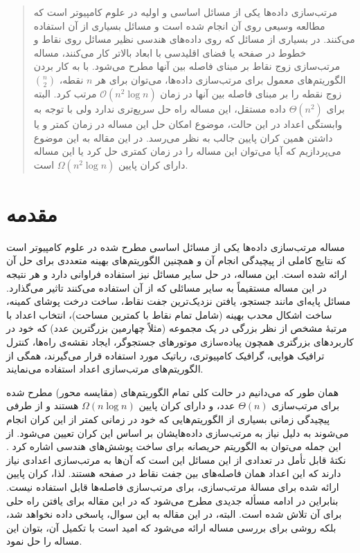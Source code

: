 \documentclass[a0,portrait]{a0poster}
\theoremstyle{definition}
\theoremstyle{plain}
\theoremstyle{definition}
\def\OO{\mathcal{O}}
\newcommand{\keywords}[1]{}
\newcommand{\subject}[1]{}
\begin{document}
\begin{multicols}{2} %




\begin{abstract}\normalsize
مرتب‌سازی داده‌ها یکی از مسائل اساسی و اولیه در علوم کامپیوتر است که مطالعه وسیعی روی آن انجام شده
است و مسائل بسیاری از آن استفاده می‌کنند. در بسیاری از مسائل که روی داده‌های هندسی نظیر مسائل روی نقاط و خطوط در صفحه یا
فضای اقلیدسی با ابعاد بالاتر کار می‌کنند، مساله مرتب‌سازی زوج نقاط بر مبنای
فاصله بین آنها مطرح می‌شود. با به کار بردن الگوریتم‌های معمول برای مرتب‌سازی
داده‌ها، می‌توان برای هر $n$ نقطه، $n\choose 2$ زوج نقطه را بر مبنای 
فاصله بین آنها در زمان $\OO(n^2\log n)$ مرتب کرد.  البته برای
$\Theta(n^2)$ داده مستقل، این مساله راه حل سریع‌تری ندارد ولی با توجه به وابستگی
اعداد در این حالت، موضوع امکان حل این مساله در زمان کمتر و یا داشتن همین کران پایین
جالب به نظر می‌رسد.
در این مقاله به این موضوع می‌پردازیم که آیا می‌توان این مساله را در زمان کمتری
حل کرد یا این مساله دارای کران پایین $\Omega(n^2\log n)$ است.
\end{abstract}
\keywords{مرتب‌سازی، فاصله‌ها، فضای اقلیدسی، کران پایین، پیچیدگی.}
\subject{68Q25, 68Q17}


\section{مقدمه}
مساله مرتب‌سازی داده‌ها یکی از مسائل اساسی مطرح شده در علوم کامپیوتر است که نتایج کاملی از پیچیدگی انجام آن و همچنین الگوریتم‌های بهینه متعددی برای حل آن ارائه شده است. این مساله، در حل سایر مسائل نیز استفاده فراوانی دارد و هر نتیجه در این مساله مستقیماً به سایر مسائلی که از آن استفاده می‌کنند تاثیر می‌گذارد. مسائل پایه‌ای مانند جستجو، یافتن نزدیک‌ترین جفت نقاط، ساخت درخت پوشای کمینه، ساخت اشکال محدب بهینه (شامل تمام نقاط با کمترین مساحت)، انتخاب اعداد با مرتبۀ مشخص از نظر بزرگی در یک مجموعه (مثلاً چهارمین بزرگترین عدد)  که خود در کاربردهای بزرگتری همچون پیاده‌سازی موتورهای جستجوگر، ایجاد نقشه‌ی راه‌ها، کنترل ترافیک هوایی، گرافیک کامپیوتری، رباتیک مورد استفاده قرار می‌گیرند، همگی از الگوریتم‌های مرتب‌سازی اعداد استفاده می‌نمایند. 

همان طور که می‌دانیم در حالت کلی تمام الگوریتم‌های (مقایسه محور) مطرح شده‌ برای مرتب‌سازی 
$\Theta(n)$ عدد،  و دارای کران پایین $\Omega(n\log n)$ هستند و از طرفی پیچیدگی زمانی بسیاری از الگوریتم‌هایی که خود در زمانی کمتر از این کران انجام می‌شوند به دلیل نیاز به مرتب‌سازی داده‌هایشان بر اساس این کران تعیین می‌شود. از این جمله می‌توان به الگوریتم حریصانه برای ساخت پوشش‌های هندسی اشاره کرد \cite{ns-gsn-07}. نکتۀ قابل تأمل در تعدادی از این مسائل این است که آن‌ها به مرتب‌سازی اعدادی نیاز دارند که این اعداد همان فاصله‌های بین جفت نقاط در صفحه هستند. لذا، کران پایین ارائه شده برای مسالۀ مرتب‌سازی، برای مرتب‌سازی فاصله‌ها قابل استفاده نیست. 
بنابراین در ادامه مسأله جدیدی  مطرح می‌شود که در این مقاله برای یافتن راه حلی برای آن تلاش شده است.
البته، در این مقاله به این سوال، پاسخی داده نخواهد شد، بلکه روشی برای بررسی مساله ارائه می‌شود که امید است با تکمیل آن، بتوان این مساله را حل نمود. 


\end{multicols}
\end{document}
